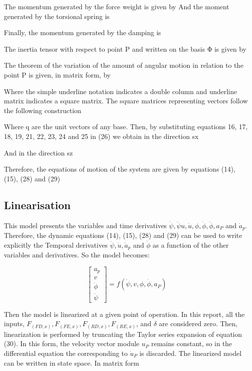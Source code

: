 \documentclass[sublist,a4paper,twoside,11pt]{article}
\begin{document}
The momentum generated by the force weight is given by
And the moment generated by the torsional spring is

Finally, the momentum generated by the damping is

The inertia tensor with respect to point P and written on the basis Φ is given by

The theorem of the variation of the amount of angular motion in relation to the point P is given, in matrix form, by


Where the simple underline notation indicates a double column and underline matrix indicates a square matrix. The square matrices representing vectors follow the following construction

Where q are the unit vectors of any base.
Then, by substituting equations 16, 17, 18, 19, 21, 22, 23, 24 and 25 in (26) we obtain in the direction sx

And in the direction sz

Therefore, the equations of motion of the system are given by equations (14), (15), (28) and (29)

\subsection{Linearisation}
This model presents the variables and time derivatives $\dot{\psi} ,\ddot{\psi} u,\dot{u}, \phi,\dot{\phi},\ddot{\phi},a_P$  and $\dot{a}_p$.  Therefore, the dynamic equations (14), (15), (28) and (29) can be used to write explicitly the Temporal derivatives $\ddot{\psi}, \dot{u}, \dot{a}_p$ and $\dot{\phi}$ as a function of the other variables and derivatives. So the model becomes:

\begin{equation}
\begin{bmatrix} a_p\\ v\\ \ddot{\phi} \\ \ddot{\psi} \end{bmatrix}=f( \dot{\psi},v,\phi,\dot{\phi}, a_P )     
\end{equation}


Then the model is linearized at a given point of operation. In this report, all the inputs, $F_(FD,x), F_(FE,x), F_(RD,x), F_(RE,x)$, and $\delta$ are considered zero. Then, linearization is performed by truncating the Taylor series expansion of equation (30). In this form, the velocity vector module $u_P$ remains constant, so in the differential equation the corresponding to $\dot{u}_P$ is discarded.
The linearized model can be written in state space. In matrix form
\end{document}
